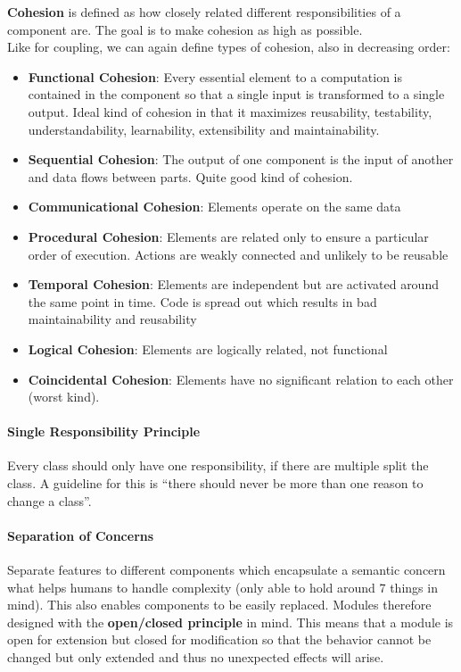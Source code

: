 \textbf{Cohesion} is defined as how closely related different responsibilities of a component are. The goal is to make cohesion as high as possible.\\
Like for coupling, we can again define types of cohesion, also in decreasing order:
\begin{itemize}
  \item \textbf{Functional Cohesion}: Every essential element to a computation is contained in the component so that a single input is transformed to a single output. Ideal kind of cohesion in that it maximizes reusability, testability, understandability, learnability, extensibility and maintainability.
  \item \textbf{Sequential Cohesion}: The output of one component is the input of another and data flows between parts. Quite good kind of cohesion.
  \item \textbf{Communicational Cohesion}: Elements operate on the same data
  \item \textbf{Procedural Cohesion}: Elements are related only to ensure a particular order of execution. Actions are weakly connected and unlikely to be reusable
  \item \textbf{Temporal Cohesion}: Elements are independent but are activated around the same point in time. Code is spread out which results in bad maintainability and reusability
  \item \textbf{Logical Cohesion}: Elements are logically related, not functional
  \item \textbf{Coincidental Cohesion}: Elements have no significant relation to each other (worst kind).
\end{itemize}

\paragraph{Single Responsibility Principle}
Every class should only have one responsibility, if there are multiple split the class.
A guideline for this is ``there should never be more than one reason to change a class''.

\paragraph{Separation of Concerns}
Separate features to different components which encapsulate a semantic concern what helps humans to handle complexity (only able to hold around 7 things in mind).
This also enables components to be easily replaced.
Modules therefore designed with the \textbf{open/closed principle} in mind.
This means that a module is open for extension but closed for modification so that the behavior cannot be changed but only extended and thus no unexpected effects will arise.

